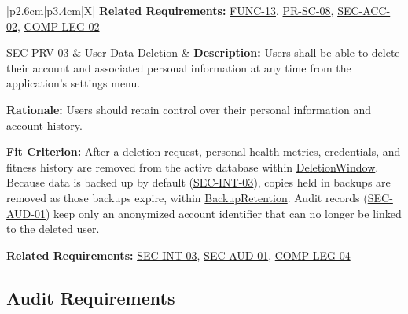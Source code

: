 \documentclass[12pt]{article}
\newcommand{\const}[1]{\hyperlink{const:#1}{\textsf{#1}}}
\begin{document}
\begin{xltabular}{\textwidth}{|p{2.6cm}|p{3.4cm}|X|}
\textbf{Related Requirements:} \hyperlink{req:FUNC-13}{FUNC-13}, \hyperlink{req:PR-SC-08}{PR-SC-08}, \hyperlink{req:SEC-ACC-02}{SEC-ACC-02}, \hyperlink{req:COMP-LEG-02}{COMP-LEG-02}\\
\hline

SEC-PRV-03\hypertarget{req:SEC-PRV-03}{} &
User Data Deletion &
\textbf{Description:} Users shall be able to delete their account and associated personal information at any time from the application's settings menu.

\textbf{Rationale:} Users should retain control over their personal information and account history.

\textbf{Fit Criterion:} After a deletion request, personal health metrics, credentials, and fitness history are removed from the active database within \const{DeletionWindow}. Because data is backed up by default (\hyperlink{req:SEC-INT-03}{SEC-INT-03}), copies held in backups are removed as those backups expire, within \const{BackupRetention}. Audit records (\hyperlink{req:SEC-AUD-01}{SEC-AUD-01}) keep only an anonymized account identifier that can no longer be linked to the deleted user.

\textbf{Related Requirements:} \hyperlink{req:SEC-INT-03}{SEC-INT-03}, \hyperlink{req:SEC-AUD-01}{SEC-AUD-01}, \hyperlink{req:COMP-LEG-04}{COMP-LEG-04}\\
\hline

\end{xltabular}
\subsection{Audit Requirements}
\end{document}
